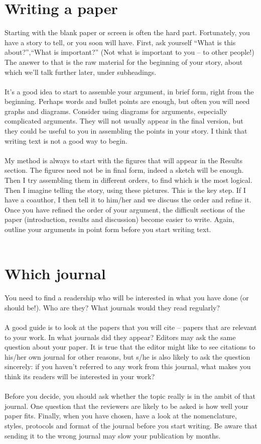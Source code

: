 \documentclass[a4paper,12pt]{article}
\begin{document}
\section{Writing a paper}
Starting with the blank paper or screen is often the hard part. Fortunately, you have a story to tell, or you soon will have. First, ask yourself “What is this about?”,“What is important?” (Not what is important to you – to other people!)  The answer to that is the raw material for the beginning of your story, about which we’ll talk further later, under subheadings.\\\\It’s a good idea to start to assemble your argument, in brief form, right from the beginning. Perhaps words and bullet points  are enough, but often you will need graphs and diagrams.  Consider using diagrams for arguments, especially complicated arguments. They will not usually appear in the final version, but they could be useful to you in assembling the points in your story. I think that writing text is not a good way to begin.\\\\My method is always to start with the figures that will appear in the Results section. The figures need not be in final form, indeed a sketch will be enough. Then I try assembling them in different orders, to find which is the most logical. Then I imagine telling the story, using these pictures. This is the key step. If I have a coauthor, I then tell it to him/her and we discuss the order and refine it. Once you have refined the order of your argument, the difficult sections of the paper (introduction, results and discussion) become easier to write. Again, outline your arguments in point form before you start writing text.\\\\
\section{Which journal}
You need to find a readership who will be interested in what you have done (or should be!). Who are they? What journals would they read regularly?\\\\A good guide is to look at the papers that you will cite – papers that are relevant to your work. In what journals did they appear? Editors may ask the same question about your paper. It is true that the editor might like to see citations to his/her own journal for other reasons, but s/he is also likely to ask the question sincerely: if you haven’t referred to any work from this journal, what makes you think its readers will be interested in your work?\\\\Before you decide, you should ask whether the topic really is in the ambit of that journal. One question that the reviewers are likely to be asked is how well your paper fits. Finally, when you have chosen, have a look at the nomenclature, styles, protocols and format of the journal before you start writing. Be aware that sending it to the wrong journal may slow your publication by months. 
\end{document}
